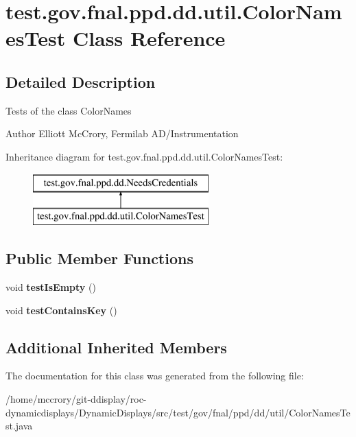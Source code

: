 \hypertarget{classtest_1_1gov_1_1fnal_1_1ppd_1_1dd_1_1util_1_1ColorNamesTest}{\section{test.\-gov.\-fnal.\-ppd.\-dd.\-util.\-Color\-Names\-Test Class Reference}
\label{classtest_1_1gov_1_1fnal_1_1ppd_1_1dd_1_1util_1_1ColorNamesTest}
}


\subsection{Detailed Description}
Tests of the class Color\-Names

\begin{DoxyAuthor}{Author}
Elliott Mc\-Crory, Fermilab A\-D/\-Instrumentation 
\end{DoxyAuthor}
Inheritance diagram for test.\-gov.\-fnal.\-ppd.\-dd.\-util.\-Color\-Names\-Test\-:\begin{figure}[H]
\begin{center}
\leavevmode
\includegraphics[height=2.000000cm]{classtest_1_1gov_1_1fnal_1_1ppd_1_1dd_1_1util_1_1ColorNamesTest}
\end{center}
\end{figure}
\subsection*{Public Member Functions}
\begin{DoxyCompactItemize}
\item 
\hypertarget{classtest_1_1gov_1_1fnal_1_1ppd_1_1dd_1_1util_1_1ColorNamesTest_aa399681fb14a75ae3c15495c64517128}{void {\bfseries test\-Is\-Empty} ()}\label{classtest_1_1gov_1_1fnal_1_1ppd_1_1dd_1_1util_1_1ColorNamesTest_aa399681fb14a75ae3c15495c64517128}

\item 
\hypertarget{classtest_1_1gov_1_1fnal_1_1ppd_1_1dd_1_1util_1_1ColorNamesTest_a07a7f6fc63284f4f6eda2668cbf0e1e7}{void {\bfseries test\-Contains\-Key} ()}\label{classtest_1_1gov_1_1fnal_1_1ppd_1_1dd_1_1util_1_1ColorNamesTest_a07a7f6fc63284f4f6eda2668cbf0e1e7}

\end{DoxyCompactItemize}
\subsection*{Additional Inherited Members}


The documentation for this class was generated from the following file\-:\begin{DoxyCompactItemize}
\item 
/home/mccrory/git-\/ddisplay/roc-\/dynamicdisplays/\-Dynamic\-Displays/src/test/gov/fnal/ppd/dd/util/Color\-Names\-Test.\-java\end{DoxyCompactItemize}

